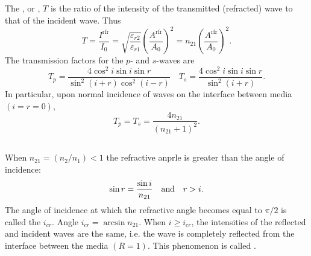 \subsection{}\label{31.5.7} The , or , $T$ is the ratio of the intensity of the transmitted (refracted) wave to that of the incident wave. Thus
\begin{equation*}
T = \frac{I^{\text{rfr}}}{I_{0}} = \sqrt{\frac{\varepsilon_{r2}}{\varepsilon_{r1}}} \left(\frac{A^{\text{rfr}}}{A_{0}}\right)^{2} = n_{21} \left(\frac{A^{\text{rfr}}}{A_{0}}\right)^{2}.
\end{equation*}
The transmission factors for the $p$- and $s$-waves are
\begin{equation*}%
T_{p} = \frac{4 \cos^{2} i \sin i \sin r}{\sin^{2} (i + r) \cos^{2} (i -r)} \quad T_{s} = \frac{4 \cos^{2} i \sin i \sin r}{\sin^{2} (i + r)}.
\end{equation*}
In particular, upon normal incidence of waves on the interface
between media $(i = r = 0)$,
\begin{equation*}%
T_{p} = T_{s} = \frac{4 n_{21}}{(n_{21} + 1)^{2}}.
\end{equation*}

\subsection{}\label{31.5.8} When $n_{21} =  (n_{2}/n_{1} ) < 1$ the refractive anprle is greater than the angle of incidence: 
\begin{equation*}%
\sin r = \frac{\sin i}{n_{21}} \qand r > i. 
\end{equation*}
The angle of incidence at which the refractive angle becomes equal to $\pi/2$ is called the  $i_{cr}$. Angle $i_{cr} = \arcsin n_{21}$. When $i \geqslant i_{cr}$, the intensities of the reflected and incident waves are the same, i.e. the wave is completely reflected from the interface between the media $(R = 1)$. This phenomenon is called .

